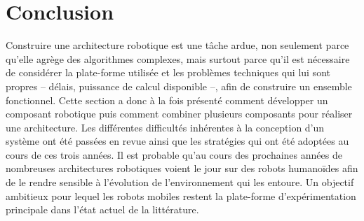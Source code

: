 \section{Conclusion}


Construire une architecture robotique est une tâche ardue, non
seulement parce qu'elle agrège des algorithmes complexes, mais surtout
parce qu'il est nécessaire de considérer la plate-forme utilisée et
les problèmes techniques qui lui sont propres -- délais, puissance de
calcul disponible --, afin de construire un ensemble
fonctionnel. Cette section a donc à la fois présenté comment
développer un composant robotique puis comment combiner plusieurs
composants pour réaliser une architecture. Les différentes difficultés
inhérentes à la conception d'un système ont été passées en revue ainsi
que les stratégies qui ont été adoptées au cours de ces trois
années. Il est probable qu'au cours des prochaines années de
nombreuses architectures robotiques voient le jour sur des robots
humanoïdes afin de le rendre sensible à l'évolution de l'environnement
qui les entoure. Un objectif ambitieux pour lequel les robots mobiles
restent la plate-forme d'expérimentation principale dans l'état actuel
de la littérature.


